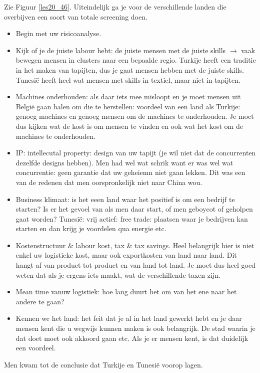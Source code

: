 \documentclass[10pt,a4paper]{report}
\begin{document}
Zie Figuur \ref{les20_46}. Uiteindelijk ga je voor de verschillende landen die overbijven een soort van totale screening doen. 
\begin{itemize}
\item Begin met uw risicoanalyse. 
\item Kijk of je de juiste labour hebt: de juiste mensen met de juiste skills $\rightarrow$ vaak bewegen mensen in clusters naar een bepaalde regio. Turkije heeft een traditie in het maken van tapijten, dus je gaat mensen hebben met de juiste skills. Tunesi\"e heeft heel wat mensen met skills in textiel, maar niet in tapijten.
\item Machines onderhouden: als daar iets mee misloopt en je moet mensen uit Belgi\"e gaan halen om die te herstellen: voordeel van een land als Turkije: genoeg machines en genoeg mensen om de machines te onderhouden. Je moet dus kijken wat de kost is om mensen te vinden en ook wat het kost om de machines te onderhouden.
\item IP: intellecutal property: design van uw tapijt (je wil niet dat de concurrenten dezelfde designs hebben). Men had wel wat schrik want er was wel wat concurrentie: geen garantie dat uw geheiemn niet gaan lekken. Dit was een van de redenen dat men oorspronkelijk niet naar China wou.
\item Business klimaat: is het eeen land waar het positief is om een bedrijf te starten? Is er het gevoel van als men daar start, of men geboycot of geholpen gaat worden? Tunesi\"e: vrij actief: free trade: plaatsen waar je bedrijven kan starten en dan krijg je voordelen qua energie etc.
\item Kostenstructuur $\&$ labour kost, tax $\&$ tax savings. Heel belangrijk hier is niet enkel uw logistieke kost, maar ook exportkosten van land naar land. Dit hangt af van product tot product en van land tot land. Je moet dus heel goed weten dat als je ergens iets maakt, wat de verschillende taxen zijn. 
\item Mean time vanuw logistiek: hoe lang duurt het om van het ene naar het andere te gaan?
\item Kennen we het land: het feit dat je al in het land gewerkt hebt en je daar mensen kent die u wegwijs kunnen maken is ook belangrijk. De stad waarin je dat doet moet ook akkoord gaan etc. Als je er mensen kent, is dat duidelijk een voordeel.
\end{itemize}

Men kwam tot de conclusie dat Turkije en Tunesi\"e voorop lagen. 
\end{document}
